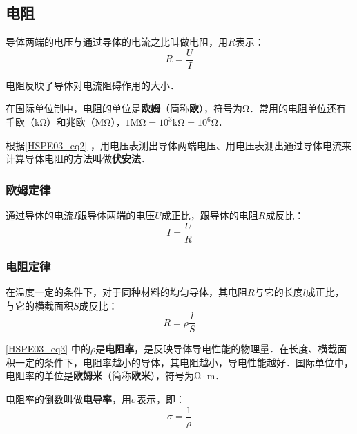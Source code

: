 \subsection{电阻}

导体两端的电压与通过导体的电流之比叫做电阻，用$R$表示：
\begin{equation}\label{HSPE03_eq2}
R=\frac{U}{I}
\end{equation}

电阻反映了导体对电流阻碍作用的大小．

在国际单位制中，电阻的单位是\textbf{欧姆}（简称\textbf{欧}），符号为$\mathrm{\Omega}$．常用的电阻单位还有千欧（$\mathrm{k\Omega}$）和兆欧（$\mathrm{M\Omega}$），$1\mathrm{M\Omega}=10^3\mathrm{k\Omega}=10^6\mathrm{\Omega}$．

根据\autoref{HSPE03_eq2} ，用电压表测出导体两端电压、用电压表测出通过导体电流来计算导体电阻的方法叫做\textbf{伏安法}．

\subsubsection{欧姆定律}

通过导体的电流$I$跟导体两端的电压$U$成正比，跟导体的电阻$R$成反比：
\begin{equation}
I=\frac{U}{R}
\end{equation}

\subsubsection{电阻定律}

在温度一定的条件下，对于同种材料的均匀导体，其电阻$R$与它的长度$l$成正比，与它的横截面积$S$成反比：
\begin{equation}\label{HSPE03_eq3}
R=\rho \frac{l}{S}
\end{equation}

\autoref{HSPE03_eq3} 中的$\rho$是\textbf{电阻率}，是反映导体导电性能的物理量．在长度、横截面积一定的条件下，电阻率越小的导体，其电阻越小，导电性能越好．国际单位中，电阻率的单位是\textbf{欧姆米}（简称\textbf{欧米}），符号为$\mathrm{\Omega\cdot m}$．

电阻率的倒数叫做\textbf{电导率}，用$\sigma$表示，即：
\begin{equation}
\sigma = \frac{1}{\rho}
\end{equation}
